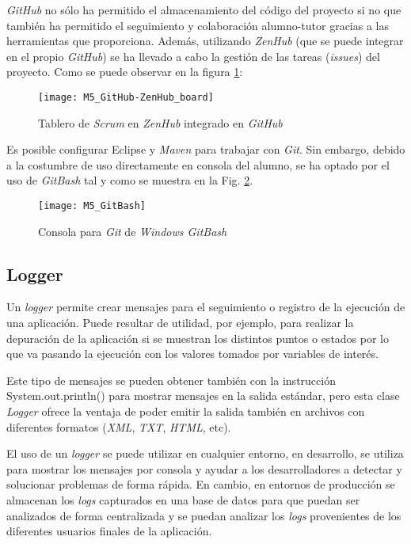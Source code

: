 \textit{GitHub} no sólo ha permitido el almacenamiento del código del proyecto si no que también ha permitido el seguimiento y colaboración alumno-tutor gracias a las herramientas que proporciona. Además, utilizando \textit{ZenHub} (que se puede integrar en el propio \textit{GitHub}) se ha llevado a cabo la gestión de las tareas (\textit{issues}) del proyecto. Como se puede observar en la figura \ref{fig:M5_GitHub-ZenHub_board}:

\begin{figure}[!h]
	\centering
	\texttt{[image: M5\_GitHub-ZenHub\_board]}
	\caption{Tablero de \textit{Scrum} en \textit{ZenHub} integrado en \textit{GitHub}}\label{fig:M5_GitHub-ZenHub_board}
\end{figure}
\FloatBarrier

Es posible configurar Eclipse y \textit{Maven} para trabajar con \textit{Git}. Sin embargo, debido a la costumbre de uso directamente en consola del alumno, se ha optado por el uso de \textit{GitBash} tal y como se muestra en la Fig. \ref{fig:M5_GitBash}.

\begin{figure}[!h]
	\centering
	\texttt{[image: M5\_GitBash]}
	\caption{Consola para \textit{Git} de \textit{Windows GitBash}}\label{fig:M5_GitBash}
\end{figure}
\FloatBarrier

\subsection{Logger}


Un \textit{logger} permite crear mensajes para el seguimiento o registro de la ejecución de una aplicación. Puede resultar de utilidad, por ejemplo, para realizar la depuración de la aplicación si se muestran los distintos puntos o estados por lo que va pasando la ejecución con los valores tomados por variables de interés\cite{logger_info}.

Este tipo de mensajes se pueden obtener también con la instrucción System.out.println() para mostrar mensajes en la salida estándar, pero esta clase \textit{Logger} ofrece la ventaja de poder emitir la salida también en archivos con diferentes formatos (\textit{XML}, \textit{TXT}, \textit{HTML}, etc).

El uso de un \textit{logger} se puede utilizar en cualquier entorno, en desarrollo, se utiliza para mostrar los mensajes por consola y ayudar a los desarrolladores a detectar y solucionar problemas de forma rápida. En cambio, en entornos de producción se almacenan los \textit{logs} capturados en una base de datos para que puedan ser analizados de forma centralizada y se puedan analizar los \textit{logs} provenientes de los diferentes usuarios finales de la aplicación.


